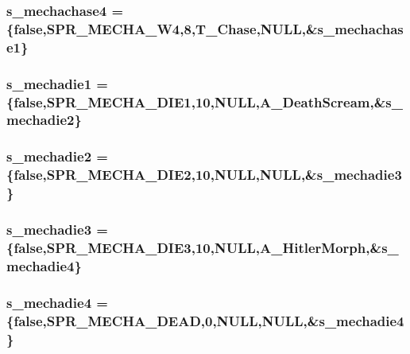 \label{WL__ACT2_8C_aaf123e2cfe781d241e08844abca78b78}
\hypertarget{WL__ACT2_8C_af7f6b236427f2c8fb9849623a079fccd}{
\subsubsection[{s\_\-mechachase4}]{ {\bf s\_\-mechachase4} = \{false,SPR\_\-MECHA\_\-W4,8,T\_\-Chase,NULL,\&{\bf s\_\-mechachase1}\}}}
\label{WL__ACT2_8C_af7f6b236427f2c8fb9849623a079fccd}
\hypertarget{WL__ACT2_8C_a6fb7dfa0612394dba59fa4d97134d19f}{
\subsubsection[{s\_\-mechadie1}]{ {\bf s\_\-mechadie1} = \{false,SPR\_\-MECHA\_\-DIE1,10,NULL,A\_\-DeathScream,\&{\bf s\_\-mechadie2}\}}}
\label{WL__ACT2_8C_a6fb7dfa0612394dba59fa4d97134d19f}
\hypertarget{WL__ACT2_8C_ab5221620a6d5d647bfadc8087fbe16a1}{
\subsubsection[{s\_\-mechadie2}]{ {\bf s\_\-mechadie2} = \{false,SPR\_\-MECHA\_\-DIE2,10,NULL,NULL,\&{\bf s\_\-mechadie3}\}}}
\label{WL__ACT2_8C_ab5221620a6d5d647bfadc8087fbe16a1}
\hypertarget{WL__ACT2_8C_a2c3b8a80ffcee5127812902c562d903f}{
\subsubsection[{s\_\-mechadie3}]{ {\bf s\_\-mechadie3} = \{false,SPR\_\-MECHA\_\-DIE3,10,NULL,A\_\-HitlerMorph,\&{\bf s\_\-mechadie4}\}}}
\label{WL__ACT2_8C_a2c3b8a80ffcee5127812902c562d903f}
\hypertarget{WL__ACT2_8C_ad5b5f331e922b78dcc8eec9b39b289fb}{
\subsubsection[{s\_\-mechadie4}]{ {\bf s\_\-mechadie4} = \{false,SPR\_\-MECHA\_\-DEAD,0,NULL,NULL,\&{\bf s\_\-mechadie4}\}}}
